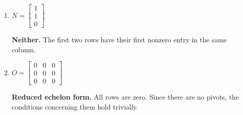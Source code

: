 \begin{enumerate}[label=\alph*)]
    \begin{answer}
        \textbf{Reduced echelon form.}
        The only pivot is $m_{12}=1$.
        The remaining conditions hold trivially.
    \end{answer}

    \item $N=
    \begin{bmatrix}
        1\\
        1\\
        0
    \end{bmatrix}$

    \begin{answer}
        \textbf{Neither.}
        The first two rows have their first
        nonzero entry in the same column.
    \end{answer}

    \item $O=
    \begin{bmatrix}
        0&0&0\\
        0&0&0\\
        0&0&0
    \end{bmatrix}$

    \begin{answer}
        \textbf{Reduced echelon form.}
        All rows are zero. Since there are no pivots,
        the conditions concerning them hold
        trivially.
    \end{answer}

\end{enumerate}
